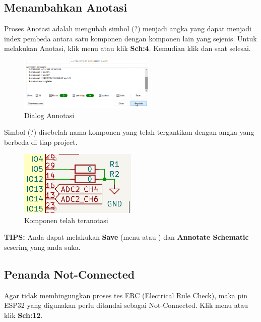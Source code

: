 \documentclass[12pt]{book}
\begin{document}
	\subsection{Menambahkan Anotasi}

	Proses Anotasi adalah mengubah simbol (?) menjadi angka yang dapat menjadi index pembeda antara
	satu komponen dengan komponen lain yang sejenis.
	Untuk melakukan Anotasi, klik menu  atau klik \textbf{Sch:4}.
	Kemudian klik  dan  saat selesai.

	\begin{figure}[!ht]
		\centering
		\includegraphics[width=0.6\textwidth]{images/sch/sch_15}
		\caption{Dialog Annotasi}
	\end{figure}

	Simbol (?) disebelah nama komponen yang telah tergantikan dengan angka yang berbeda di tiap project.

	\begin{figure}[!ht]
		\centering
		\includegraphics[width=0.5\textwidth]{images/sch/sch_16}
		\caption{Komponen telah teranotasi}
	\end{figure}

	\textbf{TIPS:} Anda dapat melakukan \textbf{Save} (menu  atau ) dan \textbf{Annotate Schematic} sesering yang anda suka.

	\newpage
	\subsection{Penanda Not-Connected}

	Agar tidak membingungkan proses tes ERC (Electrical Rule Check), maka pin ESP32 yang digunakan perlu ditandai sebagai Not-Connected.
	Klik menu  atau klik \textbf{Sch:12}.\\
\end{document}

